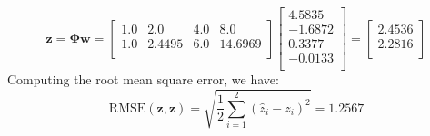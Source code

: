 \documentclass{exam}
\begin{document}
\begin{questions}
        \begin{equation*}
            \textbf{\^{z}} = \boldsymbol{\Phi}\textbf{w} = 
            \begin{bmatrix}
                1.0 & 2.0 & 4.0 & 8.0 \\
                1.0 & 2.4495 & 6.0 & 14.6969 \\
            \end{bmatrix}
            \begin{bmatrix}
                4.5835 \\
                -1.6872 \\
                0.3377 \\ 
                -0.0133 \\
            \end{bmatrix} = 
            \begin{bmatrix}
                2.4536 \\
                2.2816 \\
            \end{bmatrix}
        \end{equation*}
        Computing the root mean square error, we have:
        \begin{equation*}
           \mathrm{RMSE}(\textbf{\^{z}}, \textbf{z}) = \sqrt{\frac{1}{2}\sum_{i = 1}^{2}(\hat{z}_i - z_i)^2} = 1.2567
        \end{equation*}
        

\end{questions}
\end{document}
